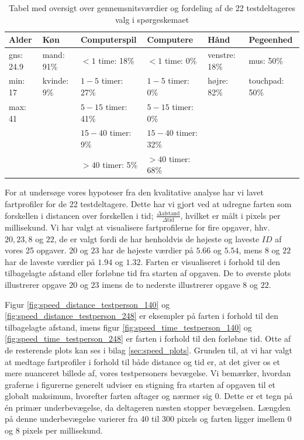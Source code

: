 \begin{table}[h]
	\centering
	\begin{tabular}{llllll}
		Alder            & Køn                  & Computerspil                & Computere                    & Hånd                   & Pegeenhed            \\\hline
		gns: \hfill24.9 & mand: \hfill91\%  & $<1$ time: \hfill18\%    & $<1$ time: \hfill0\%         & venstre: \hfill18\% & mus: \hfill50\%      \\
		min: \hfill17    & kvinde: \hfill9\% & $1-5$ timer: \hfill27\%  & $1-5$ timer: \hfill0\%       & højre: \hfill82\%   & touchpad: \hfill50\% \\
		max: \hfill41    &                      & $5-15$ timer: \hfill41\% & $5-15$ timer: \hfill0\%      &                        &                      \\
		                 &                      & $15-40$ timer: \hfill9\% & $15-40$ timer: \hfill32\% &                        &                      \\
		                 &                      & $>40$ timer: \hfill5\%   & $>40$ timer: \hfill68\%   &                        &
	\end{tabular}
	\caption{Tabel med oversigt over gennemsnitsværdier og fordeling af de 22 testdeltageres valg i spørgeskemaet}
	\label{tab:sample_persons_average}
\end{table}

For at undersøge vores hypoteser fra den kvalitative analyse har vi lavet fartprofiler for de 22 testdeltagere. Dette har vi gjort ved at udregne farten som forskellen i distancen over forskellen i tid; $\frac{\Delta \text{afstand}}{\Delta \text{tid}}$, hvilket er målt i pixels per millisekund. Vi har valgt at visualisere fartprofilerne for fire opgaver, hhv. $20,23,8$ og $22$, de er valgt fordi de har henholdvis de højeste og laveste $ID$ af vores 25 opgaver. $20$ og $23$ har de højeste værdier på $5.66$ og $5.54$, mens $8$ og $22$ har de laveste værdier på $1.94$ og $1.32$. Farten er visualiseret i forhold til den tilbagelagte afstand eller forløbne tid fra starten af opgaven. De to øverste plots illustrerer opgave $20$ og $23$ imens de to nederste illustrerer opgave $8$ og $22$.

Figur \ref{fig:speed_distance_testperson_140} og \ref{fig:speed_distance_testperson_248} er eksempler på farten i forhold til den tilbagelagte afstand, imens figur \ref{fig:speed_time_testperson_140} og \ref{fig:speed_time_testperson_248} er farten i forhold til den forløbne tid. Otte af de resterende plots kan ses i bilag \ref{sec:speed_plots}. Grunden til, at vi har valgt at medtage fartprofiler i forhold til både distance og tid er, at det giver os et mere nuanceret billede af, vores testpersoners bevægelse. Vi bemærker, hvordan graferne i figurerne generelt udviser en stigning fra starten af opgaven til et globalt maksimum, hvorefter farten aftager og nærmer sig 0. Dette er et tegn på én primær underbevægelse, da deltageren næsten stopper bevægelsen. Længden på denne underbevægelse varierer fra 40 til 300 pixels og farten ligger imellem 0 og 8 pixels per millisekund.

